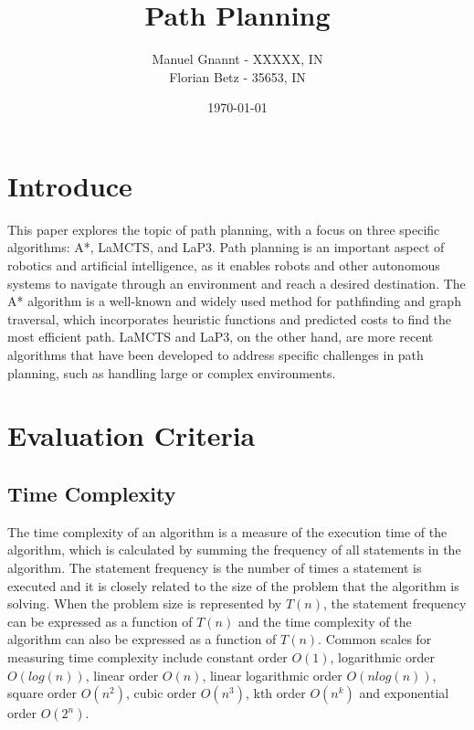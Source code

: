 \documentclass[bibliography=totoc]{scrartcl}
\title{Path Planning}
\author{Manuel Gnannt - XXXXX, IN \\ Florian Betz - 35653, IN}
\date{\today}
\begin{document}
\maketitle
\tableofcontents

\clearpage
\section{Introduce}

This paper explores the topic of path planning, with a focus on three specific algorithms: A*, LaMCTS, and LaP3. Path planning is an important aspect of robotics and artificial intelligence, as it enables robots and other autonomous systems to navigate through an environment and reach a desired destination. The A* algorithm is a well-known and widely used method for pathfinding and graph traversal, which incorporates heuristic functions and predicted costs to find the most efficient path. LaMCTS and LaP3, on the other hand, are more recent algorithms that have been developed to address specific challenges in path planning, such as handling large or complex environments.

\section{Evaluation Criteria} \label{corner_detection}

\subsection{Time Complexity}
The time complexity of an algorithm is a measure of the execution time of the algorithm, which is calculated by summing the frequency of all statements in the algorithm. The statement frequency is the number of times a statement is executed and it is closely related to the size of the problem that the algorithm is solving. When the problem size is represented by $T(n)$, the statement frequency can be expressed as a function of $T(n)$ and the time complexity of the algorithm can also be expressed as a function of $T(n)$.
Common scales for measuring time complexity include constant order $O(1)$, logarithmic order $O(log(n))$, linear order $O(n)$, linear logarithmic order $O(nlog(n))$, square order $O(n^2)$, cubic order $O(n^3)$, kth order $O(n^k)$ and exponential order $O(2^n)$.
\end{document}
